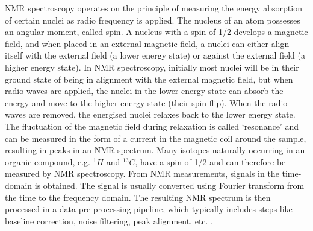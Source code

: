 NMR spectroscopy operates on the principle of measuring the energy absorption of certain nuclei as radio frequency is applied. The nucleus of an atom possesses an angular moment, called spin. A nucleus with a spin of 1/2 develops a magnetic field, and when placed in an external magnetic field, a nuclei can either align itself with the external field (a lower energy state) or against the external field (a higher energy state). In NMR spectroscopy, initially most nuclei will be in their ground state of being in alignment with the external magnetic field, but when radio waves are applied, the nuclei in the lower energy state can absorb the energy and move to the higher energy state (their spin flip). When the radio waves are removed, the energised nuclei relaxes back to the lower energy state. The fluctuation of the magnetic field during relaxation is called `resonance' and can be measured in the form of a current in the magnetic coil around the sample, resulting in peaks in an NMR spectrum. Many isotopes naturally occurring in an organic compound, e.g. $^{1}H$ and $^{13}C$,  have a spin of 1/2 and can therefore be measured by NMR spectroscopy. From NMR measurements, signals in the time-domain is obtained. The signal is usually converted using Fourier transform from the time to the frequency domain. The resulting NMR spectrum is then processed in a data pre-processing pipeline, which typically includes steps like baseline correction, noise filtering, peak alignment, etc. \cite{Alonso2015}.


